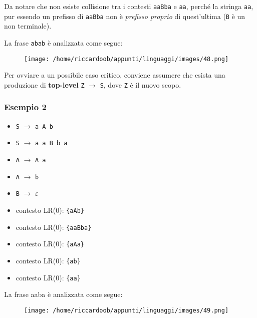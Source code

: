Da notare che non esiste collisione tra i contesti \texttt{aaBba} e \texttt{aa}, perché la stringa \texttt{aa}, pur essendo un prefisso di \texttt{aaBba} non è \textit{prefisso proprio} di quest'ultima (\texttt{B} è un non terminale).

La frase \texttt{abab} è analizzata come segue:

\begin{figure}[H]
    \centering
    \texttt{[image: /home/riccardoob/appunti/linguaggi/images/48.png]}
\end{figure}

Per ovviare a un possibile caso critico, conviene assumere che esista una produzione di \textbf{top-level} \texttt{Z} $\rightarrow$ \texttt{S}, dove \texttt{Z} è il nuovo scopo.

\subsubsection{Esempio 2}

\begin{multicols}{2}
    \begin{itemize}
        \item \texttt{S} $\rightarrow$ \texttt{a A b}
        \item \texttt{S} $\rightarrow$ \texttt{a a B b a}
        \item \texttt{A} $\rightarrow$ \texttt{A a}
        \item \texttt{A} $\rightarrow$ \texttt{b}
        \item \texttt{B} $\rightarrow$ $\varepsilon$
    \end{itemize}
    \columnbreak
    \begin{itemize}
        \item[] contesto LR(0): \texttt{\{aAb\}}
        \item[] contesto LR(0): \texttt{\{aaBba\}}
        \item[] contesto LR(0): \texttt{\{aAa\}}
        \item[] contesto LR(0): \texttt{\{ab\}}
        \item[] contesto LR(0): \texttt{\{aa\}}
    \end{itemize}
\end{multicols}
\setlist{}

La frase aaba è analizzata come segue:
\begin{figure}[H]
    \centering
    \texttt{[image: /home/riccardoob/appunti/linguaggi/images/49.png]}
\end{figure}

